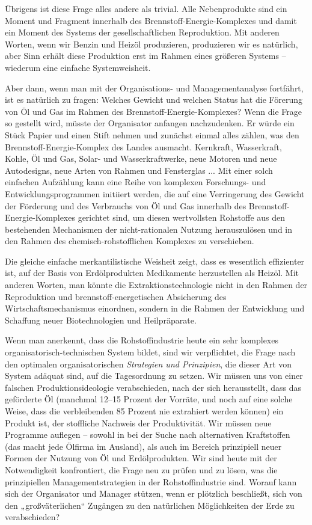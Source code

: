 \documentclass[11pt,a4paper]{article}
\begin{document}
Übrigens ist diese Frage alles andere als trivial. Alle Nebenprodukte sind ein
Moment und Fragment innerhalb des Brennstoff-Energie-Komplexes und damit ein
Moment des Systems der gesellschaftlichen Reproduktion. Mit anderen Worten,
wenn wir Benzin und Heizöl produzieren, produzieren wir es natürlich, aber
Sinn erhält diese Produktion erst im Rahmen eines größeren Systems -- wiederum
eine einfache Systemweisheit.

Aber dann, wenn man mit der Organisations- und Managementanalyse fortfährt,
ist es natür\-lich zu fragen: Welches Gewicht und welchen Status hat die
Förerung von Öl und Gas im Rahmen des Brennstoff-Energie-Komplexes?  Wenn die
Frage so gestellt wird, müsste der Organisator anfangen nachzudenken. Er würde
ein Stück Papier und einen Stift nehmen und zunächst einmal alles zählen, was
den Brennstoff-Energie-Komplex des Landes ausmacht.  Kernkraft, Wasserkraft,
Kohle, Öl und Gas, Solar- und Wasserkraftwerke, neue Motoren und neue
Autodesigns, neue Arten von Rahmen und Fensterglas ... Mit einer solch
einfachen Aufzählung kann eine Reihe von komplexen Forschungs- und
Entwicklungsprogrammen initiiert werden, die auf eine Verringerung des Gewicht
der Förderung und des Verbrauchs von Öl und Gas innerhalb des
Brennstoff-Energie-Komplexes gerichtet sind, um diesen wertvollsten Rohstoffe
aus den bestehenden Mechanismen der nicht-rationalen Nutzung herauszulösen und
in den Rahmen des chemisch-rohstoff\-lichen Komplexes zu verschieben.

Die gleiche einfache merkantilistische Weisheit zeigt, dass es wesentlich
effizienter ist, auf der Basis von Erdölprodukten Medikamente herzustellen als
Heizöl. Mit anderen Worten, man könnte die Extraktionstechnologie nicht in den
Rahmen der Reproduktion und brennstoff-energetischen Absicherung des
Wirtschaftsmechanismus einordnen, sondern in die Rahmen der Entwicklung und
Schaffung neuer Biotechnologien und Heilpräparate.

Wenn man anerkennt, dass die Rohstoff\-industrie heute ein sehr komplexes
organisatorisch-technischen System bildet, sind wir verpflichtet, die Frage
nach den optimalen organisatorischen \emph{Strategien und Prinzipien}, die
dieser Art von System adäquat sind, auf die Tagesordnung zu setzen. Wir müssen
uns von einer falschen Produktionsideologie verabschieden, nach der sich
herausstellt, dass das geförderte Öl (manchmal 12--15 Prozent der Vorräte, und
noch auf eine solche Weise, dass die verbleibenden 85 Prozent nie extrahiert
werden können) ein Produkt ist, der stoff\-liche Nachweis der Produktivität.
Wir müssen neue Programme auf\-legen -- sowohl in bei der Suche nach
alternativen Kraftstoffen (das macht jede Ölfirma im Ausland), als auch im
Bereich prinzipiell neuer Formen der Nutzung von Öl und Erdölprodukten.  Wir
sind heute mit der Notwendigkeit konfrontiert, die Frage neu zu prüfen und zu
lösen, was die prinzipiellen Managementstrategien in der Rohstoff\-industrie
sind.  Worauf kann sich der Organisator und Manager stützen, wenn er plötzlich
beschließt, sich von den „großväterlichen“ Zugängen zu den natürlichen
Möglichkeiten der Erde zu verabschieden?
\end{document}

